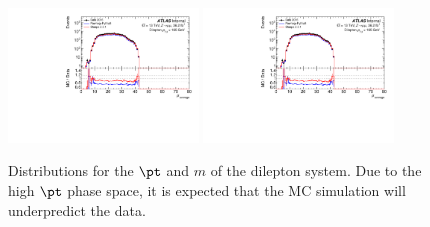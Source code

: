 \begin{figure}[h!]
  \centering
  \includegraphics[page=12,width=0.45\textwidth]{figures/ZjetOmnifoldMCDataComp.pdf}
  \includegraphics[page=16,width=0.45\textwidth]{figures/ZjetOmnifoldMCDataComp.pdf}
  \caption{Distributions for the $\pt$ and $m$ of the dilepton system. Due to the high $\pt$ phase space, it is expected that the MC simulation will underpredict the data.}
  \label{fig:pTmll}
\end{figure}

